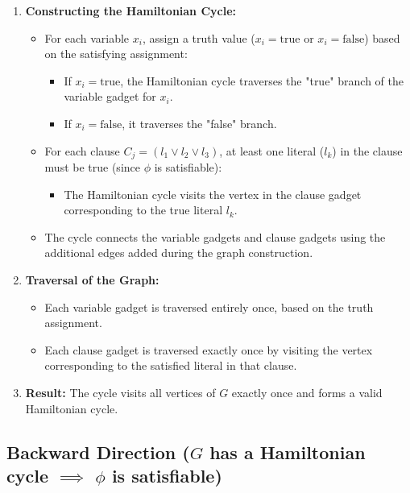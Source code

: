 \documentclass[10pt,letter,notitlepage]{article}
\begin{document}
\begin{Answer}
\begin{enumerate}
    \item \textbf{Constructing the Hamiltonian Cycle:}
    \begin{itemize}
        \item For each variable \(x_i\), assign a truth value (\(x_i = \text{true}\) or \(x_i = \text{false}\)) based on the satisfying assignment:
        \begin{itemize}
            \item If \(x_i = \text{true}\), the Hamiltonian cycle traverses the "true" branch of the variable gadget for \(x_i\).
            \item If \(x_i = \text{false}\), it traverses the "false" branch.
        \end{itemize}
        \item For each clause \(C_j = (l_1 \lor l_2 \lor l_3)\), at least one literal (\(l_k\)) in the clause must be true (since \(\phi\) is satisfiable):
        \begin{itemize}
            \item The Hamiltonian cycle visits the vertex in the clause gadget corresponding to the true literal \(l_k\).
        \end{itemize}
        \item The cycle connects the variable gadgets and clause gadgets using the additional edges added during the graph construction.
    \end{itemize}

    \item \textbf{Traversal of the Graph:}
    \begin{itemize}
        \item Each variable gadget is traversed entirely once, based on the truth assignment.
        \item Each clause gadget is traversed exactly once by visiting the vertex corresponding to the satisfied literal in that clause.
    \end{itemize}

    \item \textbf{Result:} The cycle visits all vertices of \(G\) exactly once and forms a valid Hamiltonian cycle.
\end{enumerate}

\subsection*{Backward Direction (\(G\) has a Hamiltonian cycle \(\implies\) \(\phi\) is satisfiable)}


\end{Answer}
\end{document}
